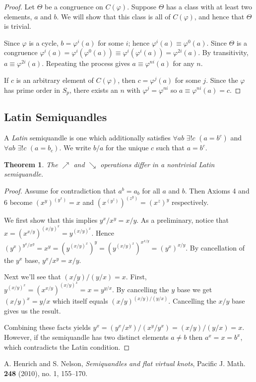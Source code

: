 \documentclass{amsart}
\newtheorem{thm}{Theorem}[section]
\theoremstyle{definition}
\numberwithin{equation}{section}
\begin{document}
\begin{proof}
Let $\Theta$ be a congruence on $C(\varphi)$. Suppose $\Theta$ has
a class with at least two elements, $a$ and $b$. We will show that
this class is all of $C(\varphi)$, and hence that $\Theta$ is
trivial.

Since $\varphi$ is a cycle, $b = \varphi^{i}(a)$ for some $i$; hence
$\varphi^{i}(a) \equiv \varphi^{0}(a)$. Since $\Theta$ is a congruence
$\varphi^{i}(a) = \varphi^{i}(\varphi^{0}(a)) \equiv
\varphi^{i}(\varphi^{i}(a)) = \varphi^{2i}(a)$. By transitivity,
$a \equiv \varphi^{2i}(a)$. Repeating the process gives $a \equiv
\varphi^{ni}(a)$ for any $n$.

If $c$ is an arbitrary element of $C(\varphi)$, then $c = \varphi^{j}(a)$
for some $j$.  Since the $\varphi$ has prime order in $S_p$, there
exists an $n$ with $\varphi^{j} = \varphi^{ni}$ so $a \equiv
\varphi^{ni}(a) = c$.  \end{proof}

\subsection{Latin Semiquandles}

A \emph{Latin} semiquandle is one which additionally satisfies
$\forall{ab}$ $\exists!{c}$ $(a=b^c)$ and $\forall{ab}$ $\exists!{c}$
$(a=b_c)$. We write $b/a$ for the unique $c$ such that $a = b^{c}$.

\begin{thm}
The $\nearrow$ and $\searrow$ operations differ in a nontrivial
Latin semiquandle.
\end{thm}
\begin{proof}
Assume for contradiction that $a^{b} = a_b$ for all $a$ and $b$.
Then Axioms 4 and 6 become $(x^y)^{(y^x)} = x$ and $(x^{(y^z)})^{(z^y)}
= (x^z)^y$ respectively.

We first show that this implies $y^{x}/x^{y} = x/y$. As a preliminary,
notice that $x = (x^{x/y})^{(x/y)^{x}} = y^{(x/y)^{x}}$. Hence
$(y^{x})^{y^{x}/x^{y}} = x^{y} = (y^{(x/y)^{x}})^{y} =
(y^{(x/y)^{x}})^{x^{x/y}} = (y^{x})^{x/y}$. By cancellation of the
$y^{x}$ base, $y^{x} / x^{y} = x/y$.

Next we'll see that $(x/y)/(y/x) = x$. First, $y^{{(x/y)}^{x}} =
(x^{x/y})^{{(x/y)}^{x}} = x = y^{y/x}$. By cancelling the $y$ base
we get $(x/y)^{x} = y/x$ which itself equals $(x/y)^{(x/y)/(y/x)}$.
Cancelling the $x/y$ base gives us the result.

Combining these facts yields $y^{x} = (y^{x}/x^{y}) / (x^{y}/y^{x})
= (x/y) / (y/x) = x$. However, if the semiquandle has two distinct
elements $a \neq b$ then $a^{x} = x = b^{x}$, which contradicts the
Latin condition.
\end{proof}

\begin{thebibliography}{9}

      A. Henrich and S. Nelson, \emph{Semiquandles and flat virtual
      knots}, Pacific J. Math. \textbf{248} (2010), no. 1, 155--170.

\end{thebibliography}
\end{document}
